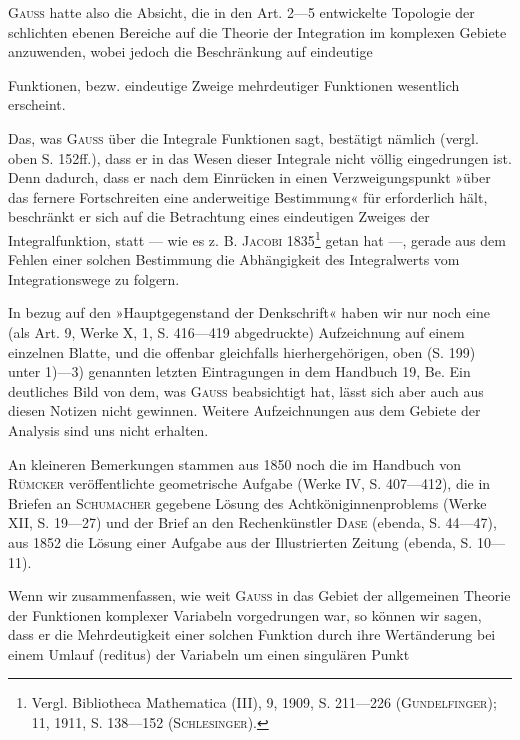 \par
\textsc{Gauss} hatte also die Absicht, die in den Art. 2—5 entwickelte Topologie
der schlichten ebenen Bereiche auf die Theorie der Integration im komplexen
Gebiete anzuwenden, wobei jedoch die Beschränkung auf eindeutige\par
\clearpage{}
\noindent Funktionen, bezw. eindeutige Zweige mehrdeutiger Funktionen wesentlich erscheint.
\par
Das, was \textsc{Gauss} über die Integrale  Funktionen sagt, bestätigt
nämlich (vergl. oben S. 152ff.), dass er in das Wesen dieser Integrale
nicht völlig eingedrungen ist. Denn dadurch, dass er nach dem Einrücken
in einen Verzweigungspunkt »über das fernere Fortschreiten eine anderweitige
Bestimmung« für erforderlich hält, beschränkt er sich auf die Betrachtung
eines eindeutigen Zweiges der Integralfunktion, statt — wie es z. B. \textsc{Jacobi}
1835\footnote{Vergl. Bibliotheca Mathematica (III), 9, 1909, S. 211—226 (\textsc{Gundelfinger}); 11, 1911, S. 138—152 (\textsc{Schlesinger}).} getan hat —, gerade aus dem Fehlen einer solchen Bestimmung die
Abhängigkeit des Integralwerts vom Integrationswege zu folgern.
\par
In bezug auf den »Hauptgegenstand der Denkschrift« haben wir nur noch
eine (als Art. 9, Werke X, 1, S. 416—419 abgedruckte) Aufzeichnung auf
einem einzelnen Blatte, und die offenbar gleichfalls hierhergehörigen, oben
(S. 199) unter 1)—3) genannten letzten Eintragungen in dem Handbuch 19, Be.
Ein deutliches Bild von dem, was \textsc{Gauss} beabsichtigt hat, lässt sich aber auch
aus diesen Notizen nicht gewinnen. Weitere Aufzeichnungen aus dem Gebiete
der Analysis sind uns nicht erhalten.
\par
An kleineren Bemerkungen stammen aus 1850 noch die im Handbuch
von \textsc{Rümcker} veröffentlichte geometrische Aufgabe (Werke IV, S. 407—412),
die in Briefen an \textsc{Schumacher} gegebene Lösung des Achtköniginnenproblems
(Werke XII, S. 19—27) und der Brief an den Rechenkünstler \textsc{Dase} (ebenda,
S. 44—47), aus 1852 die Lösung einer Aufgabe aus der Illustrierten Zeitung
(ebenda, S. 10—11).
\par
Wenn wir zusammenfassen, wie weit \textsc{Gauss} in das Gebiet der allgemeinen
Theorie der Funktionen komplexer Variabeln vorgedrungen war, so können
wir sagen, dass er die Mehrdeutigkeit einer solchen Funktion durch ihre Wertänderung
bei einem Umlauf (reditus) der Variabeln um einen singulären Punkt

